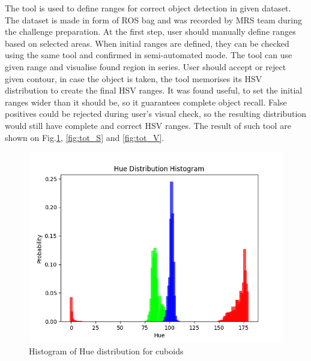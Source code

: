 \documentclass{ctuthesis}
\begin{document}
The tool is used to define ranges for correct object detection in given dataset. The dataset is made in form of ROS bag and was recorded by MRS team during the challenge preparation. At the first step, user should manually define ranges based on selected areas. When initial ranges are defined, they can be checked using the same tool and confirmed in semi-automated mode. The tool can use given range and visualise found region in series. User should accept or reject given contour, in case the object is taken, the tool memorises its HSV distribution to create the final HSV ranges. It was found useful, to set the initial ranges wider than it should be, so it guarantees complete object recall. False positives could be rejected during user's visual check, so the resulting distribution would still have complete and correct HSV ranges. The result of such tool are shown on Fig.\ref{fig:tot_H}, \ref{fig:tot_S} and \ref{fig:tot_V}.

\begin{figure}[htbp]
    \centering
    \includegraphics[width=\textwidth]{HSV_tot_H.png}
    \caption{Histogram of Hue distribution for cuboids}
    \label{fig:tot_H}
\end{figure}
\end{document}
